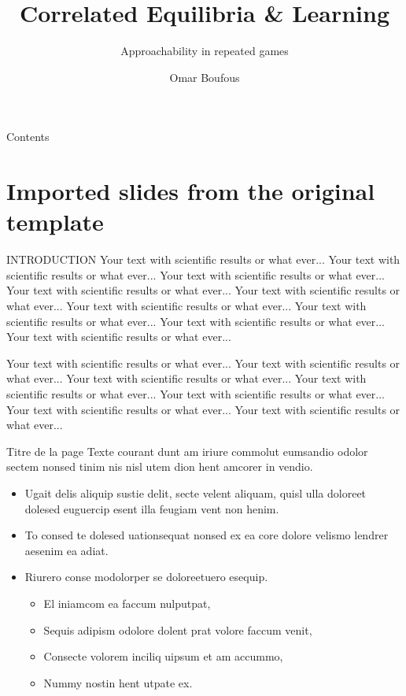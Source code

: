 \documentclass[aspectratio=169, 9pt]{beamer}
\author{Omar Boufous}
\title[Correlated Equilibria \& Learning]{Correlated Equilibria \& Learning \\[2mm]}
\subtitle{Approachability in repeated games}
\begin{document}

\begin{frame}[plain]
\titlepage
\end{frame}

\begin{frame}{\textcolor{inriaGrey}{Contents}}
  \tableofcontents
\end{frame}

 
\section{Imported slides from the original template}


\begin{frame}{INTRODUCTION}
	Your text with scientific results or what ever... Your text with
scientific results or what ever... Your text with scientific results or
what ever... Your text with scientific results or what ever... Your
text with scientific results or what ever... Your text with scientific
results or what ever... Your text with scientific results or what
ever... Your text with scientific results or what ever... Your text
with scientific results or what ever...

Your text with scientific results or what ever... Your text with
scientific results or what ever... Your text with scientific results or
what ever... Your text with scientific results or what ever... Your
text with scientific results or what ever... Your text with scientific
results or what ever... Your text with scientific results or what
ever...
\end{frame}


\begin{frame}{Titre de la page}
Texte courant dunt am iriure commolut eumsandio odolor sectem
nonsed tinim nis nisl utem dion hent amcorer in vendio.

\begin{itemize}
\item Ugait delis aliquip sustie delit, secte velent aliquam, quisl ulla
  doloreet dolesed euguercip esent illa feugiam vent non henim.
\item To consed te dolesed uationsequat nonsed ex ea core dolore
velismo lendrer aesenim ea adiat.
\item Riurero conse modolorper se doloreetuero esequip.
  \begin{itemize}
  \item El iniamcom ea faccum nulputpat,
  \item Sequis adipism odolore dolent prat volore faccum venit,
  \item Consecte volorem inciliq uipsum et am accummo,
  \item Nummy nostin hent utpate ex.
  \end{itemize}
\end{itemize}
\end{frame}
\end{document}
